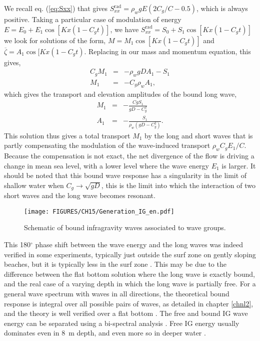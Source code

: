 We recall eq. (\ref{eq:Sxx}) that gives $S_{xx}^{\mathrm{rad}}=\rho_w g E (2 C_g/C - 0.5)$, which is always positive. 
Taking a particular case of modulation of energy $E=E_0+ E_1 \cos [K x (1-C_g t)]$, we have
$S_{xx}^{\mathrm{rad}} = S_0 + S_1 \cos [K x (1-C_g t)]$ we look for solutions of the form, $M=M_1  \cos [K x (1-C_g t)]$
and  $\overline{\zeta}=A_1  \cos [K x (1-C_g t)$.  Replacing in our mass and momentum equation, this gives, 
\begin{eqnarray}
C_g M_1 &=& - \rho_w g D A_1 -  S_1 \\
 M_1 &=& - C_g \rho_w  A_1,
\end{eqnarray}
which gives the transport and elevation amplitudes of the bound long wave, 
\begin{eqnarray}
M_1 &=& - \frac{Cg S_1}{gD - C_g^2}\\
 A_1 &=& - \frac{ S_1}{\rho_w (gD - C_g^2)}.
\end{eqnarray}
This solution thus gives a total transport $M_1$ by the long and short waves that is partly compensating 
the modulation of the wave-induced transport $\rho_w C_g E_1/C$. Because the compensation is not exact, the net divergence 
of the flow is driving a change in  mean sea level, with a lower level where the wave energy $E_1$ is larger.
It should be noted that this bound wave response has a singularity in the limit of shallow water when $C_g \rightarrow \sqrt{gD}$, this is 
the limit into which the interaction of two short waves and the long wave becomes resonant. 
\begin{figure}[htb]
\centerline{\texttt{[image: FIGURES/CH15/Generation\_IG\_en.pdf]}}
  \caption{Schematic of bound infragravity waves associated to wave groups.}
    \label{IGfig}
\end{figure}

This 180$^\circ$ phase shift between the wave energy and the long waves was indeed verified in some experiments, typically just outside the surf zone on 
gently sloping beaches, but it is typically less in the surf zone \citep{Elgar&Guza1985b}. This may be due to the difference between  the flat bottom 
solution where the long wave is exactly bound, and the real case of a varying depth in which the long wave is partially free. For a general wave 
spectrum with waves in all directions, the theoretical bound response is integral over all possible pairs of waves, as detailed in chapter \ref{chnl2}, and the theory 
is well verified over a flat bottom \citep{Herbers&al.1994a}. The free and bound IG wave energy can be separated using a bi-spectral analysis  
\citep{Herbers&al.1994a}. Free IG energy usually dominates even in 8~m depth, and even more so in deeper water \citep{Herbers&al.1995}. 

